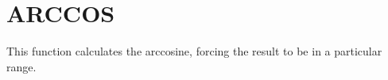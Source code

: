 \section{ARCCOS}
\label{sect:arccos}

\noindent This function calculates the arccosine, forcing the result to be
in a particular range.

